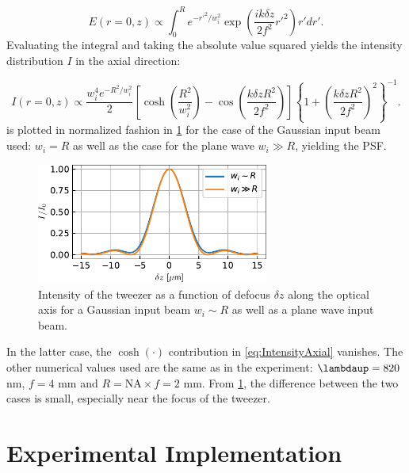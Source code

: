 \begin{equation}
	E(r=0,z) \propto \int_0^R e^{-r'^2/w_i^2} \exp{\left(
		\frac{i k \delta z}{2f^2}r'^2
		\right)} r'dr'.
\end{equation}
Evaluating the integral and taking the absolute value squared yields the intensity distribution $I$ in the axial direction:



\begin{equation}\label{eq:IntensityAxial}
	I(r=0,z) \propto \frac{w_i^4 e^{-R^2/w_i^2}}{2} \left[
	\cosh\left(\frac{R^2}{w_i^2}\right)-\cos\left(\frac{k \delta z R^2}{2f^2}\right)
	\right]
	\left\{
	1+\left(\frac{k\delta z R^2}{2 f^2}\right)^2
	\right\}^{-1}.
\end{equation}
 is plotted in normalized fashion in \cref{fig:PSFvsLongitudinal} for the case of the Gaussian input beam used: $w_i = R$ as well as the case for the plane wave $w_i \gg R$, yielding the \ac{PSF}.
\begin{figure}
	\centering
	\includegraphics[width=0.68\textwidth]{figures/LongitudinalTweezerField.pdf}
	\caption{Intensity of the tweezer as a function of defocus $\delta z$ along the optical axis for a Gaussian input beam $w_i \sim R$ as well as a plane wave input beam.}
	\label{fig:PSFvsLongitudinal}
\end{figure}
In the latter case, the $\cosh(\cdot)$ contribution in \cref{eq:IntensityAxial} vanishes.
The other numerical values used are the same as in the experiment: $\lambdaup= 820$ nm, $f=4$ mm and $R = \text{NA} \times f = 2$ mm.
From \cref{fig:PSFvsLongitudinal}, the difference between the two cases is small, especially near the focus of the tweezer.





\section{Experimental Implementation}\label{sec:MeasuringTweezer}

